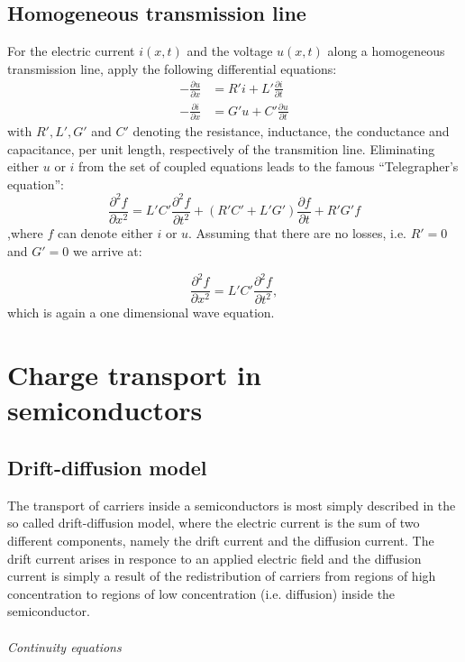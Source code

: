\subsection{Homogeneous transmission line}
For the electric current $i(x,t)$ and the voltage $u(x,t)$ along a homogeneous transmission line, apply the following differential equations:
\begin{align}
  -\frac{\partial u}{\partial x} &= R'i + L' \frac{\partial i}{\partial t} \\
  -\frac{\partial i}{\partial x} &= G' u + C' \frac{\partial u}{\partial t} 
\end{align}
with $R', L' , G' $ and $C'$ denoting the resistance, inductance, the conductance and capacitance, per unit length, respectively of the transmition line. Eliminating either $u$ or $i$ from the set of coupled equations leads to the famous ``Telegrapher's equation'':
\begin{equation}
  \label{eq:telegrapherequation}
\frac{\partial^2 f}{\partial x^2} = L'C'\frac{\partial^2 f}{\partial t^2}+ (R'C'+L'G')\frac{\partial f}{\partial t} + R'G' f
\end{equation}
,where $f$ can denote either $i$ or $u$. Assuming that there are no losses, i.e. $R' = 0 $ and $G' = 0$ we arrive at:

\begin{equation}
\frac{\partial^2 f}{\partial x^2} = L'C'\frac{\partial^2 f}{\partial t^2},
\end{equation}
which is again a one dimensional wave equation. 

\section{Charge transport in semiconductors}
\subsection*{Drift-diffusion model}

The transport of carriers inside a semiconductors is most simply described in the so called drift-diffusion model, where the electric current is the sum of two different components, namely the drift current and the diffusion current. The drift current arises in responce to an applied electric field and the diffusion current is simply a result of the redistribution of carriers from regions of high concentration to regions of low concentration (i.e. diffusion) inside the semiconductor.\\\\
\emph{Continuity equations}\\


